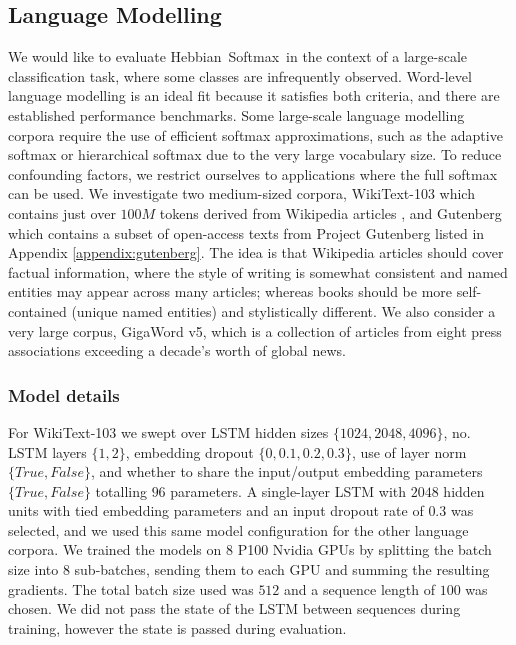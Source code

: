 \documentclass{article} \usepackage{hyperref}
\newcommand{\model}{\hbox{Hebbian Softmax }}
\begin{document}
\subsection{Language Modelling}
We would like to evaluate \model in the context of a large-scale classification task, where some classes are infrequently observed. Word-level language modelling is an ideal fit because it satisfies both criteria, and there are established performance benchmarks. Some large-scale language modelling corpora require the use of efficient softmax approximations, such as the adaptive softmax \citep{grave2016efficient} or hierarchical softmax \citep{goodman2001classes} due to the very large vocabulary size. To reduce confounding factors, we restrict ourselves to applications where the full softmax can be used. We investigate two medium-sized corpora, WikiText-103  which contains just over $100M$ tokens derived from Wikipedia articles \citep{merity2016pointer}, and Gutenberg which contains a subset of open-access texts from Project Gutenberg listed in Appendix \ref{appendix:gutenberg}. The idea is that Wikipedia articles should cover factual information, where the style of writing is somewhat consistent and named entities may appear across many articles; whereas books should be more self-contained (unique named entities) and stylistically different. We also consider a very large corpus, GigaWord v5, which is a collection of articles from eight press associations exceeding a decade's worth of global news.

\subsubsection{Model details}
For WikiText-103 we swept over LSTM hidden sizes $\{1024, 2048, 4096\}$, no. LSTM layers $\{1, 2\}$, embedding dropout $\{0, 0.1, 0.2, 0.3\}$, use of layer norm \citep{ba2016layer} $\{\textit{True}, \textit{False}\}$, and whether to share the input/output embedding parameters $\{\textit{True}, \textit{False}\}$ totalling $96$ parameters. A single-layer LSTM with $2048$ hidden units with tied embedding parameters and an input dropout rate of $0.3$ was selected, and we used this same model configuration for the other language corpora. We trained the models on $8$ P100 Nvidia GPUs by splitting the batch size into $8$ sub-batches, sending them to each GPU and summing the resulting gradients. The total batch size used was $512$ and a sequence length of $100$ was chosen. We did not pass the state of the LSTM between sequences during training, however the state is passed during evaluation. 
\end{document}
